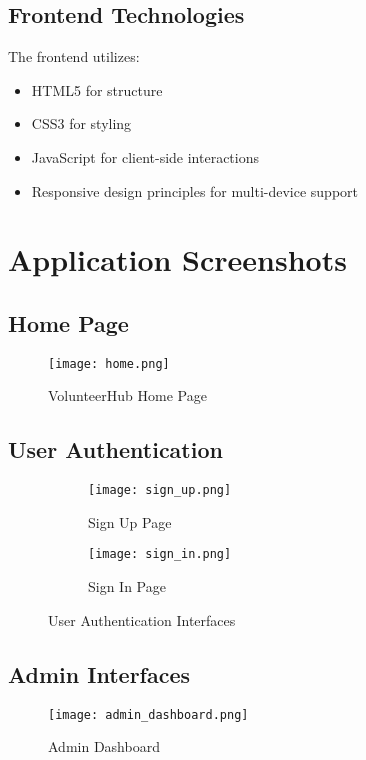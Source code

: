 \documentclass[12pt,a4paper]{report}
\begin{document}
\subsection{Frontend Technologies}
The frontend utilizes:
\begin{itemize}
    \item HTML5 for structure
    \item CSS3 for styling
    \item JavaScript for client-side interactions
    \item Responsive design principles for multi-device support
\end{itemize}

\section{Application Screenshots}

\subsection{Home Page}
\begin{figure}[H]
    \centering
    \texttt{[image: home.png]}
    \caption{VolunteerHub Home Page}
    \label{fig:home}
\end{figure}

\subsection{User Authentication}
\begin{figure}[H]
    \centering
    \begin{subfigure}[b]{0.48\textwidth}
        \texttt{[image: sign\_up.png]}
        \caption{Sign Up Page}
        \label{fig:signup}
    \end{subfigure}
    \hfill
    \begin{subfigure}[b]{0.48\textwidth}
        \texttt{[image: sign\_in.png]}
        \caption{Sign In Page}
        \label{fig:signin}
    \end{subfigure}
    \caption{User Authentication Interfaces}
    \label{fig:auth}
\end{figure}

\subsection{Admin Interfaces}
\begin{figure}[H]
    \centering
    \texttt{[image: admin\_dashboard.png]}
    \caption{Admin Dashboard}
    \label{fig:admin-dashboard}
\end{figure}
\end{document}
